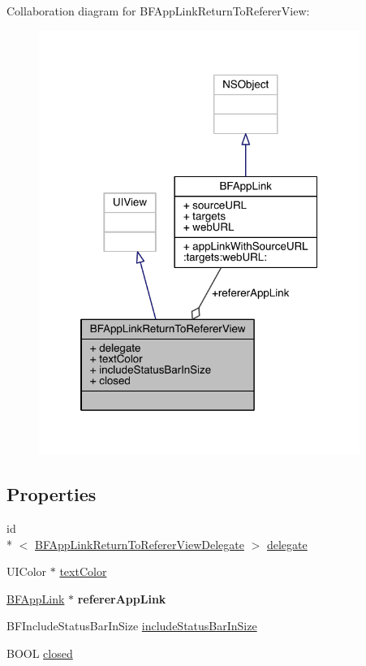 Collaboration diagram for B\-F\-App\-Link\-Return\-To\-Referer\-View\-:
\nopagebreak
\begin{figure}[H]
\begin{center}
\leavevmode
\includegraphics[width=296pt]{interface_b_f_app_link_return_to_referer_view__coll__graph}
\end{center}
\end{figure}
\subsection*{Properties}
\begin{DoxyCompactItemize}
\item 
id\\*
$<$ \hyperlink{protocol_b_f_app_link_return_to_referer_view_delegate-p}{B\-F\-App\-Link\-Return\-To\-Referer\-View\-Delegate} $>$ \hyperlink{interface_b_f_app_link_return_to_referer_view_aca2022c4be7763b7450d2a39df24b95a}{delegate}
\item 
U\-I\-Color $\ast$ \hyperlink{interface_b_f_app_link_return_to_referer_view_acef579105c567f8f22a2604ea388a37b}{text\-Color}
\item 
\hypertarget{interface_b_f_app_link_return_to_referer_view_ab4a55f394888bd423c01532a9c6dafef}{\hyperlink{interface_b_f_app_link}{B\-F\-App\-Link} $\ast$ {\bfseries referer\-App\-Link}}\label{interface_b_f_app_link_return_to_referer_view_ab4a55f394888bd423c01532a9c6dafef}

\item 
B\-F\-Include\-Status\-Bar\-In\-Size \hyperlink{interface_b_f_app_link_return_to_referer_view_a640b53f5c49f1bfb5f11a81a8f7381af}{include\-Status\-Bar\-In\-Size}
\item 
B\-O\-O\-L \hyperlink{interface_b_f_app_link_return_to_referer_view_acb041d67e8a2f626ae99a788aa8d1da4}{closed}
\end{DoxyCompactItemize}


